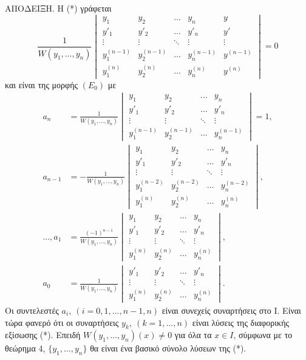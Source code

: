 \documentclass[11pt,a4paper,twoside]{book}
\begin{document}
\textsc{ΑΠΟΔΕΙΞΗ.} Η (*) γράφεται
\[
    \frac{1}{W(y_1, \dots, y_n)}
    \begin{vmatrix}
        y_1 & y_2 & \dots & y_n & y \\
        y'_1 & y'_2 & \dots & y'_n & y' \\
        \vdots & \vdots & \ddots & \vdots & \vdots \\
        y_1^{(n-1)} & y_2^{(n-1)} & \dots & y_n^{(n-1)} & y^{(n-1)} \\
        y_1^{(n)} & y_2^{(n)} & \dots & y_n^{(n)} & y^{(n)}
    \end{vmatrix} = 0
\]
και είναι της μορφής $(E_0)$ με
\begin{align*}
    a_n &= \frac{1}{W(y_1, \dots, y_n)}
    \begin{vmatrix}
        y_1 & y_2 & \dots & y_n \\
        y'_1 & y'_2 & \dots & y'_n \\
        \vdots & \vdots & \ddots & \vdots \\
        y_1^{(n-1)} & y_2^{(n-1)} & \dots & y_n^{(n-1)}
    \end{vmatrix} = 1, \\
    a_{n-1} &= -\frac{1}{W(y_1, \dots, y_n)}
    \begin{vmatrix}
        y_1 & y_2 & \dots & y_n \\
        y'_1 & y'_2 & \dots & y'_n \\
        \vdots & \vdots & \ddots & \vdots \\
        y_1^{(n-2)} & y_2^{(n-2)} & \dots & y_n^{(n-2)} \\
        y_1^{(n)} & y_2^{(n)} & \dots & y_n^{(n)}
    \end{vmatrix}, \\
    \dots, a_1 &= \frac{(-1)^{n-1}}{W(y_1, \dots, y_n)}
    \begin{vmatrix}
        y_1 & y_2 & \dots & y_n \\
        y'_1 & y'_2 & \dots & y'_n \\
        \vdots & \vdots & \ddots & \vdots \\
        y_1^{(n)} & y_2^{(n)} & \dots & y_n^{(n)}
    \end{vmatrix}, \\
    a_0 &= \frac{1}{W(y_1, \dots, y_n)}
    \begin{vmatrix}
        y'_1 & y'_2 & \dots & y'_n \\
        \vdots & \vdots & \ddots & \vdots \\
        y_1^{(n)} & y_2^{(n)} & \dots & y_n^{(n)}
    \end{vmatrix}.
\end{align*}
Οι συντελεστές $a_i,\ (i=0,1,\dots,n-1,n)$ είναι συνεχείς συναρτήσεις στο Ι. Είναι τώρα φανερό ότι οι συναρτήσεις $y_k,\ (k=1,\dots,n)$ είναι λύσεις της διαφορικής εξίσωσης (*). Επειδή $W(y_1, \dots, y_n)(x) \ne 0$ για όλα τα $x \in I$, σύμφωνα με το θεώρημα 4, $\{y_1, \dots, y_n\}$ θα είναι ένα βασικό σύνολο λύσεων της (*).
\end{document}
